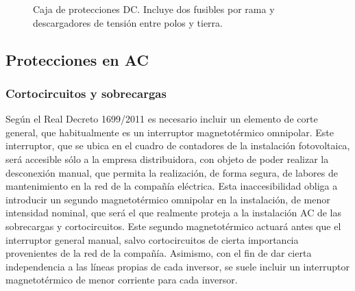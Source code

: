 %
\begin{figure}
  \hspace{1cm}
\caption{Caja de protecciones DC. Incluye dos
  fusibles por rama y descargadores de tensión entre polos y
  tierra.\label{fig:Caja-de-proteccion}}
\end{figure}



\subsection{Protecciones en AC}


\subsubsection{Cortocircuitos y sobrecargas}

Según el Real Decreto 1699/2011\cite{RealDecreto2011} es necesario
incluir un elemento de corte general, que habitualmente es un
interruptor magnetotérmico omnipolar. Este interruptor, que se ubica
en el cuadro de contadores de la instalación fotovoltaica, será
accesible sólo a la empresa distribuidora, con objeto de poder
realizar la desconexión manual, que permita la realización, de forma
segura, de labores de mantenimiento en la red de la compañía
eléctrica. Esta inaccesibilidad obliga a introducir un segundo
magnetotérmico omnipolar en la instalación, de menor intensidad
nominal, que será el que realmente proteja a la instalación AC de las
sobrecargas y cortocircuitos. Este segundo magnetotérmico actuará
antes que el interruptor general manual, salvo cortocircuitos de
cierta importancia provenientes de la red de la compañía. Asimismo,
con el fin de dar cierta independencia a las líneas propias de cada
inversor, se suele incluir un interruptor magnetotérmico de menor
corriente para cada inversor.

